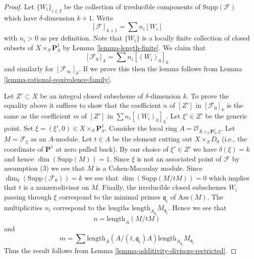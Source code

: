 \documentclass[10pt,a4paper]{amsart}
\theoremstyle{plain}
\theoremstyle{definition}
\theoremstyle{remark}
\numberwithin{equation}{subsection}
\begin{document}
\begin{proof}
Let $\{W_i\}_{i \in I}$ be the collection of irreducible
components of $\text{Supp}(\mathcal{F})$
which have $\delta$-dimension $k + 1$.
Write
$$
[\mathcal{F}]_{k + 1} = \sum n_i[W_i]
$$
with $n_i > 0$ as per definition. Note that $\{W_i\}$
is a locally finite collection of closed subsets of
$X \times_S \mathbf{P}^1_S$ by Lemma \ref{lemma-length-finite}.
We claim that
$$
[\mathcal{F}_0]_k = \sum n_i[(W_i)_0]_k
$$
and similarly for $[\mathcal{F}_\infty]_k$. If we prove this then the lemma
follows from Lemma \ref{lemma-rational-equivalence-family}.

\medskip\noindent
Let $Z' \subset X$ be an integral closed subscheme of $\delta$-dimension $k$.
To prove the equality above it suffices to show that the coefficient $n$
of $[Z']$ in $[\mathcal{F}_0]_k$ is the same as the coefficient $m$ of
$[Z']$ in $\sum n_i[(W_i)_0]_k$. Let $\xi' \in Z'$ be the generic point.
Set $\xi = (\xi', 0) \in  X \times_S \mathbf{P}^1_S$.
Consider the local ring $A = \mathcal{O}_{X \times_S \mathbf{P}^1_S, \xi}$.
Let $M = \mathcal{F}_\xi$ as an $A$-module.
Let $t \in A$ be the element cutting out $X \times_S D_0$
(i.e., the coordinate of $\mathbf{P}^1$ at zero pulled back).
By our choice of $\xi' \in Z'$ we have $\delta(\xi) = k$
and hence $\dim(\text{Supp}(M)) = 1$. Since $\xi$ is not an associated point
of $\mathcal{F}$ by assumption (3) we see that $M$ is a Cohen-Macaulay module.
Since $\dim_\delta(\text{Supp}(\mathcal{F}_0)) = k$
we see that $\dim(\text{Supp}(M/tM)) = 0$ which implies that $t$
is a nonzerodivisor on $M$. Finally, the irreducible closed subschemes
$W_i$ passing through $\xi$ correspond to the minimal primes
$\mathfrak q_i$ of $\text{Ass}(M)$. The multiplicities $n_i$ correspond
to the lengths $\text{length}_{A_{\mathfrak q_i}}M_{\mathfrak q_i}$.
Hence we see that
$$
n = \text{length}_A(M/tM)
$$
and
$$
m = \sum
\text{length}_A(A/(t, \mathfrak q_i)A)
\text{length}_{A_{\mathfrak q_i}}M_{\mathfrak q_i}
$$
Thus the result follows from
Lemma \ref{lemma-additivity-divisors-restricted}.
\end{proof}
\end{document}
